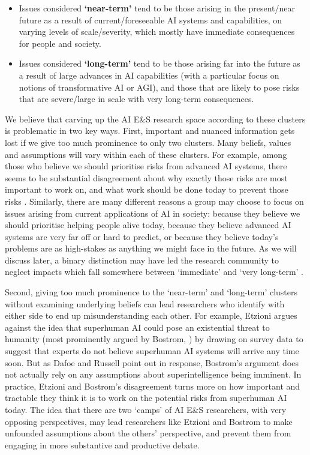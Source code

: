 \documentclass[sigconf]{acmart}
\begin{document}
\begin{itemize}
    \item[] Issues considered \textbf{`near-term'} tend to be those arising in the present/near future as a result of current/foreseeable AI systems and capabilities, on varying levels of scale/severity, which mostly have immediate consequences for people and society.
    \item[]Issues considered \textbf{`long-term'} tend to be those arising far into the future as a result of large advances in AI capabilities (with a particular focus on notions of transformative AI or AGI), and those that are likely to pose risks that are severe/large in scale with very long-term consequences.
\end{itemize}

We believe that carving up the AI E\&S research space according to these clusters is problematic in two key ways. First, important and nuanced information gets lost if we give too much prominence to only two clusters. Many beliefs, values and assumptions will vary within each of these clusters. For example, among those who believe we should prioritise risks from advanced AI systems, there seems to be substantial disagreement about why exactly those risks are most important to work on, and what work should be done today to prevent those risks \cite{sittler2019,ngo2019}. Similarly, there are many different reasons a group may choose to focus on issues arising from current applications of AI in society: because they believe we should prioritise helping people alive today, because they believe advanced AI systems are very far off or hard to predict, or because they believe today's problems are as high-stakes as anything we might face in the future. As we will discuss later, a binary distinction may have led the research community to neglect impacts which fall somewhere between `immediate' and `very long-term' \cite{parson_artificial_2019}. 

Second, giving too much prominence to the `near-term' and `long-term' clusters without examining underlying beliefs can lead researchers who identify with either side to end up misunderstanding each other. For example, Etzioni \cite{etzioni_no_2016} argues against the idea that superhuman AI could pose an existential threat to humanity (most prominently argued by Bostrom, \cite{bostrom_superintelligence_2014}) by drawing on survey data to suggest that experts do not believe superhuman AI systems will arrive any time soon. But as Dafoe and Russell \cite{dafoe_yes_2016} point out in response, Bostrom's argument does not actually rely on any assumptions about superintelligence being imminent. In practice, Etzioni and Bostrom's disagreement turns more on how important and tractable they think it is to work on the potential risks from superhuman AI today. The idea that there are two `camps' of AI E\&S researchers, with very opposing perspectives, may lead researchers like Etzioni and Bostrom to make unfounded assumptions about the others' perspective, and prevent them from engaging in more substantive and productive debate. 
\end{document}
